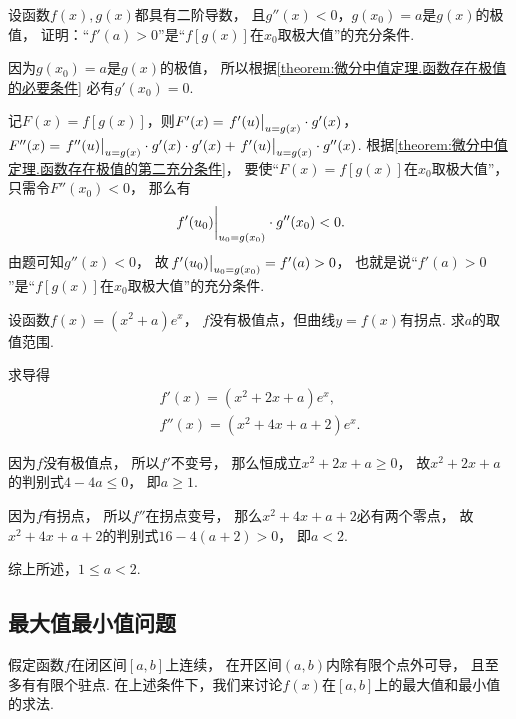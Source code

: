 \begin{example}
设函数\(f(x),g(x)\)都具有二阶导数，
且\(g''(x)<0\)，\(g(x_0)=a\)是\(g(x)\)的极值，
证明：“\(f'(a)>0\)”是“\(f[g(x)]\)在\(x_0\)取极大值”的充分条件.
\begin{solution}
因为\(g(x_0)=a\)是\(g(x)\)的极值，
所以根据\cref{theorem:微分中值定理.函数存在极值的必要条件}
必有\(g'(x_0)=0\).

记\(F(x) = f[g(x)]\)，则\(F'(x) = \eval{f'(u)}_{u=g(x)} \cdot g'(x)\)，
\(F''(x) = \eval{f''(u)}_{u=g(x)} \cdot g'(x) \cdot g'(x)
+ \eval{f'(u)}_{u=g(x)} \cdot g''(x)\).
根据\cref{theorem:微分中值定理.函数存在极值的第二充分条件}，
要使“\(F(x)=f[g(x)]\)在\(x_0\)取极大值”，只需令\(F''(x_0) < 0\)，
那么有\begin{equation*}
	\eval{f'(u_0)}_{u_0=g(x_0)} \cdot g''(x_0) < 0.
\end{equation*}
由题可知\(g''(x)<0\)，
故\(\eval{f'(u_0)}_{u_0=g(x_0)} = f'(a) > 0\)，
也就是说“\(f'(a)>0\)”是“\(f[g(x)]\)在\(x_0\)取极大值”的充分条件.
\end{solution}
\end{example}

\begin{example}
设函数\(f(x) = (x^2 + a) e^x\)，
\(f\)没有极值点，但曲线\(y = f(x)\)有拐点.
求\(a\)的取值范围.
\begin{solution}
求导得\begin{gather*}
	f'(x) = (x^2 + 2x + a) e^x, \\
	f''(x) = (x^2 + 4x + a + 2) e^x.
\end{gather*}

因为\(f\)没有极值点，
所以\(f'\)不变号，
那么恒成立\(x^2 + 2x + a \geq 0\)，
故\(x^2 + 2x + a\)的判别式\(4 - 4a \leq 0\)，
即\(a \geq 1\).

因为\(f\)有拐点，
所以\(f''\)在拐点变号，
那么\(x^2 + 4x + a + 2\)必有两个零点，
故\(x^2 + 4x + a + 2\)的判别式\(16 - 4(a+2) > 0\)，
即\(a < 2\).

综上所述，\(1 \leq a < 2\).
\end{solution}
\end{example}

\subsection{最大值最小值问题}
假定函数\(f\)在闭区间\([a,b]\)上连续，
在开区间\((a,b)\)内除有限个点外可导，
且至多有有限个驻点.
在上述条件下，我们来讨论\(f(x)\)在\([a,b]\)上的最大值和最小值的求法.

